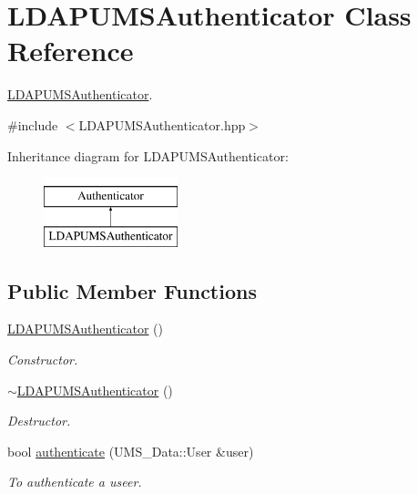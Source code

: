 \hypertarget{classLDAPUMSAuthenticator}{
\section{LDAPUMSAuthenticator Class Reference}
\label{classLDAPUMSAuthenticator}
}


\hyperlink{classLDAPUMSAuthenticator}{LDAPUMSAuthenticator}.  




{\ttfamily \#include $<$LDAPUMSAuthenticator.hpp$>$}

Inheritance diagram for LDAPUMSAuthenticator:\begin{figure}[H]
\begin{center}
\leavevmode
\includegraphics[height=2.000000cm]{classLDAPUMSAuthenticator}
\end{center}
\end{figure}
\subsection*{Public Member Functions}
\begin{DoxyCompactItemize}
\item 
\hypertarget{classLDAPUMSAuthenticator_a6b476dbcf68856cb016f66e7f696fd9a}{
\hyperlink{classLDAPUMSAuthenticator_a6b476dbcf68856cb016f66e7f696fd9a}{LDAPUMSAuthenticator} ()}
\label{classLDAPUMSAuthenticator_a6b476dbcf68856cb016f66e7f696fd9a}

\begin{DoxyCompactList}\small\item\em Constructor. \item\end{DoxyCompactList}\item 
\hypertarget{classLDAPUMSAuthenticator_a9e940c1c689be229de460eaee362bb5e}{
\hyperlink{classLDAPUMSAuthenticator_a9e940c1c689be229de460eaee362bb5e}{$\sim$LDAPUMSAuthenticator} ()}
\label{classLDAPUMSAuthenticator_a9e940c1c689be229de460eaee362bb5e}

\begin{DoxyCompactList}\small\item\em Destructor. \item\end{DoxyCompactList}\item 
bool \hyperlink{classLDAPUMSAuthenticator_a8035770e05331d70fddb766d1a950257}{authenticate} (UMS\_\-Data::User \&user)
\begin{DoxyCompactList}\small\item\em To authenticate a useer. \item\end{DoxyCompactList}\end{DoxyCompactItemize}


